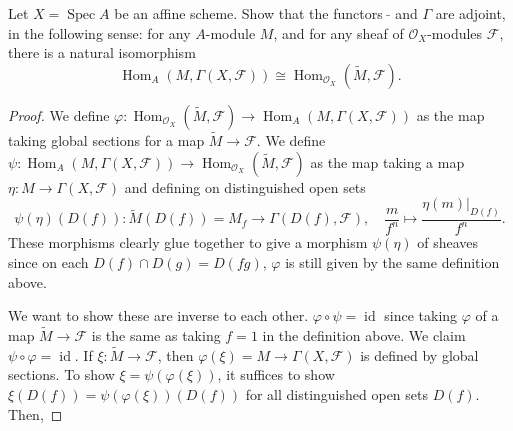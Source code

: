 \documentclass[10pt]{article}
\newcounter{enumicounter}
\newenvironment{enumi}
{\begin{list}{$(\roman{enumicounter})$}{\usecounter{enumicounter} \parsep=0em
\itemsep=0em \leftmargin=2.5em \labelwidth=1.75em \topsep=0em}}
{\end{list}}
\theoremstyle{definition}
\theoremstyle{remark}
\numberwithin{equation}{section}
\numberwithin{figure}{subsubsection}
\DeclareMathOperator{\Spec}{Spec}
\DeclareMathOperator{\Hom}{Hom}
\DeclareMathOperator{\id}{id}
\newcommand{\FF}{\mathscr{F}}
\newcommand{\OO}{\mathcal{O}}
\begin{document}
\begin{problem}
  Let $X = \Spec A$ be an affine scheme. Show that the functors $\:\tilde{}$ and $\Gamma$ are adjoint, in the following sense: for any $A$-module $M$, and for any sheaf of $\OO_X$-modules $\FF$, there is a natural isomorphism
  \begin{equation*}
    \Hom_A(M,\Gamma(X,\FF)) \cong \Hom_{\OO_X}(\tilde{M},\FF).
  \end{equation*}
\end{problem}
\begin{proof}
  We define $\varphi\colon \Hom_{\OO_X}(\tilde{M},\FF) \to \Hom_A(M,\Gamma(X,\FF))$ as the map taking global sections for a map $\tilde{M} \to \FF$. We define $\psi\colon \Hom_A(M,\Gamma(X,\FF)) \to \Hom_{\OO_X}(\tilde{M},\FF)$ as the map taking a map $\eta\colon M \to \Gamma(X,\FF)$ and defining on distinguished open sets
  \begin{equation*}
    \psi(\eta)(D(f))\colon \tilde{M}(D(f)) = M_f \to \Gamma(D(f),\FF), \quad \frac{m}{f^n} \mapsto \frac{\eta(m)\vert_{D(f)}}{f^n}.
  \end{equation*}
  These morphisms clearly glue together to give a morphism $\psi(\eta)$ of sheaves since on each $D(f) \cap D(g) = D(fg)$, $\varphi$ is still given by the same definition above.
  \par We want to show these are inverse to each other. $\varphi \circ \psi = \id$ since taking $\varphi$ of a map $\tilde{M} \to \FF$ is the same as taking $f=1$ in the definition above. We claim $\psi \circ \varphi = \id$. If $\xi \colon \tilde{M} \to \FF$, then $\varphi(\xi) = M \to \Gamma(X,\FF)$ is defined by global sections. To show $\xi = \psi(\varphi(\xi))$, it suffices to show $\xi(D(f)) = \psi(\varphi(\xi))(D(f))$ for all distinguished open sets $D(f)$. Then,

\end{proof}
\end{document}

